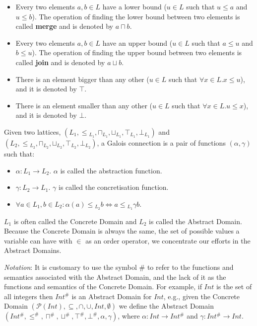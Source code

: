 \documentclass[
11pt, %
english, %
singlespacing, %
headsepline, %
]{MastersDoctoralThesis} %
\providecommand{\tightlist}{%
  \setlength{\itemsep}{0pt}\setlength{\parskip}{0pt}}
\begin{document}
\begin{itemize}
\tightlist
\item
  Every two elements \(a, b \in L\) have a lower bound (\(u \in L\) such
  that \(u \le a\) and \(u \le b\)). The operation of finding the lower
  bound between two elements is called \textbf{merge} and is denoted by
  \(a \sqcap b\).
\item
  Every two elements \(a, b \in L\) have an upper bound (\(u \in L\)
  such that \(a \le u\) and \(b \le u\)). The operation of finding the
  upper bound between two elements is called \textbf{join} and is
  denoted by \(a \sqcup b\).
\item
  There is an element bigger than any other (\(u \in L\) such that
  \(\forall x \in L . x \le u\)), and it is denoted by \(\top\).
\item
  There is an element smaller than any other (\(u \in L\) such that
  \(\forall x \in L . u \le x\)), and it is denoted by \(\bot\).
\end{itemize}

Given two lattices,
\((L_1, \le{}_{L_1}, \sqcap{}_{L_1}, \sqcup{}_{L_1}, \top{}_{L_1}, \bot{}_{L_1})\)
and
\((L{}_2, \le{}_{L_2}, \sqcap{}_{L_2}, \sqcup{}_{L_2}, \top{}_{L_2}, \bot{}_{L_2})\),
a Galois connection is a pair of functions \((\alpha, \gamma)\) such
that:

\begin{itemize}
\tightlist
\item
  \(\alpha : L_1 \rightarrow L_2\). \(\alpha\) is called the abstraction
  function.
\item
  \(\gamma : L_2 \rightarrow L_1\). \(\gamma\) is called the
  concretisation function.
\item
  \(\forall a \in L_1, b \in L_2 : \alpha(a) \le{}_{L_2} b \iff a \le{}_{L_1} \gamma{b}\).
\end{itemize}

\(L_1\) is often called the Concrete Domain and \(L_2\) is called the
Abstract Domain. Because the Concrete Domain is always the same, the set
of possible values a variable can have with \(\in\) as an order
operator, we concentrate our efforts in the Abstract Domains.

\emph{Notation}: It is customary to use the symbol \(\#\) to refer to
the functions and semantics associated with the Abstract Domain, and the
lack of it as the functions and semantics of the Concrete Domain. For
example, if \(Int\) is the set of all integers then \(Int^{\#}\) is an
Abstract Domain for \(Int\), e.g., given the Concrete Domain
\((\mathcal{P}(Int), \subseteq, \cap, \cup, Int, \emptyset)\) we define
the Abstract Domain
\((Int^{\#}, \le^{\#}, \sqcap^{\#}, \sqcup^{\#}, \top^{\#}, \bot^{\#}, \alpha, \gamma)\),
where \(\alpha : Int \rightarrow Int^{\#}\) and
\(\gamma : Int^{\#} \rightarrow Int\).
\end{document}
